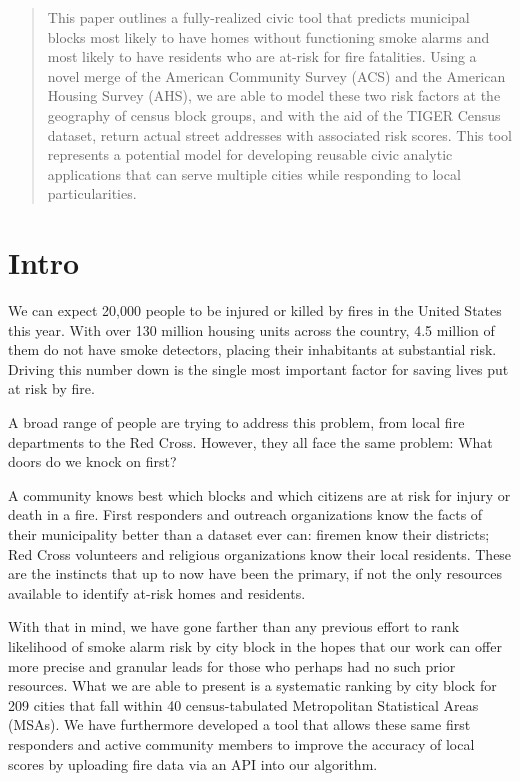 \documentclass{sig-alternate}
\begin{document}
\maketitle
\begin{abstract}
This paper outlines a fully-realized civic tool that predicts municipal blocks most likely to have homes without functioning smoke alarms and most likely to have residents who are at-risk for fire fatalities. Using a novel merge of the American Community Survey (ACS) and the American Housing Survey (AHS), we are able to model these two risk factors at the geography of census block groups, and with the aid of the TIGER Census dataset, return actual street addresses with associated risk scores. This tool represents a potential model for developing reusable civic analytic applications that can serve multiple cities while responding to local particularities.
\end{abstract}



\section{Intro}
We can expect 20,000 people to be injured or killed by fires in the United States this year. With over 130 million housing units across the country, 4.5 million of them do not have smoke detectors, placing their inhabitants at substantial risk. Driving this number down is the single most important factor for saving lives put at risk by fire.

A broad range of people are trying to address this problem, from local fire departments to the Red Cross. However, they all face the same problem: What doors do we knock on first?

A community knows best which blocks and which citizens are at risk for injury or death in a fire. First responders and outreach organizations know the facts of their municipality better than a dataset ever can: firemen know their districts; Red Cross volunteers and religious organizations know their local residents. These are the instincts that up to now have been the primary, if not the only resources available to identify at-risk homes and residents. 

With that in mind, we have gone farther than any previous effort to rank likelihood of smoke alarm risk by city block in the hopes that our work can offer more precise and granular leads for those who perhaps had no such prior resources. What we are able to present is a systematic ranking by city block for 209 cities that fall within 40 census-tabulated Metropolitan Statistical Areas (MSAs). We have furthermore developed a tool that allows these same first responders and active community members to improve the accuracy of local scores by uploading fire data via an API into our algorithm.
\end{document}
